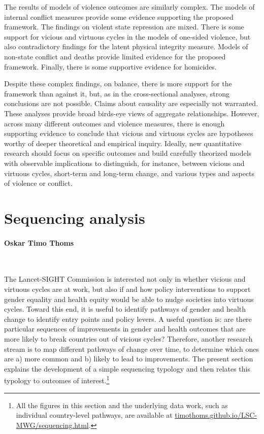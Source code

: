 \documentclass[12pt]{article}
\begin{document}
The results of models of violence outcomes are similarly complex.
The models of internal conflict measures provide some evidence supporting the proposed framework.
The findings on violent state repression are mixed.
There is some support for vicious and virtuous cycles in the models of one-sided violence, but also contradictory findings for the latent physical integrity measure.
Models of non-state conflict and deaths provide limited evidence for the proposed framework.
Finally, there is some supportive evidence for homicides.

Despite these complex findings, on balance, there is more support for the framework than against it, but, as in the cross-sectional analyses, strong conclusions are not possible.
Claims about causality are especially not warranted.
These analyses provide broad birds-eye views of aggregate relationships.
However, across many different outcomes and violence measures, there is enough supporting evidence to conclude that vicious and virtuous cycles are hypotheses worthy of deeper theoretical and empirical inquiry.
Ideally, new quantitative research should focus on specific outcomes and build carefully theorized models with observable implications to distinguish, for instance, between vicious and virtuous cycles, short-term and long-term change, and various types and aspects of violence or conflict.

\section{Sequencing analysis}
\label{sequencing}
\paragraph{Oskar Timo Thoms}\ \bigskip

The Lancet-SIGHT Commission is interested not only in whether vicious and virtuous  cycles are at work, but also if and how policy interventions to support gender equality and health equity would be able to nudge societies into virtuous cycles. Toward this end, it is useful to identify pathways of gender and health change to identify entry points and policy levers.
A useful question is: are there particular sequences of improvements in gender and health outcomes that are more likely to break countries out of vicious cycles?
Therefore, another research stream is to map different pathways of change over time, to determine which ones are a) more common and b) likely to lead to improvements.
The present section explains the development of a simple sequencing typology and then relates this typology to outcomes of interest.\footnote{
All the figures in this section and the underlying data work, such as individual country-level pathways, are available at \href{https://timothoms.github.io/LSC-MWG/sequencing.html}{timothoms.github.io/LSC-MWG/sequencing.html}.}
\end{document}
